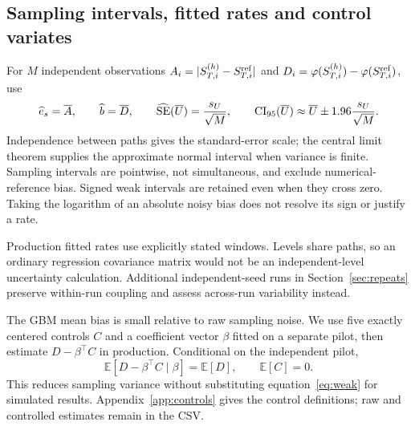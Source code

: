 \documentclass[11pt,a4paper]{article}
\begin{document}
\subsection{Sampling intervals, fitted rates and control variates}
For $M$ independent observations $A_i=|S_{T,i}^{(h)}-S_{T,i}^{\rm ref}|$ and $D_i=\varphi(S_{T,i}^{(h)})-\varphi(S_{T,i}^{\rm ref})$, use
\begin{equation}\label{eq:mc-ci}
\widehat e_s=\overline A,\qquad \widehat b=\overline D,\qquad
\widehat{\rm SE}(\overline U)=\frac{s_U}{\sqrt M},\qquad
{\rm CI}_{95}(\overline U)\approx\overline U\pm1.96\frac{s_U}{\sqrt M}.
\end{equation}
Independence between paths gives the standard-error scale; the central limit theorem supplies the approximate normal interval when variance is finite. Sampling intervals are pointwise, not simultaneous, and exclude numerical-reference bias. Signed weak intervals are retained even when they cross zero. Taking the logarithm of an absolute noisy bias does not resolve its sign or justify a rate.

Production fitted rates use explicitly stated windows. Levels share paths, so an ordinary regression covariance matrix would not be an independent-level uncertainty calculation. Additional independent-seed runs in Section~\ref{sec:repeats} preserve within-run coupling and assess across-run variability instead.

The GBM mean bias is small relative to raw sampling noise. We use five exactly centered controls $C$ and a coefficient vector $\beta$ fitted on a separate pilot, then estimate $D-\beta^\top C$ in production. Conditional on the independent pilot,
\begin{equation}\label{eq:control-unbiased}
\mathbb E[D-\beta^\top C\mid\beta]=\mathbb E[D],\qquad \mathbb E[C]=0.
\end{equation}
This reduces sampling variance without substituting equation~\eqref{eq:weak} for simulated results. Appendix~\ref{app:controls} gives the control definitions; raw and controlled estimates remain in the CSV.
\end{document}

